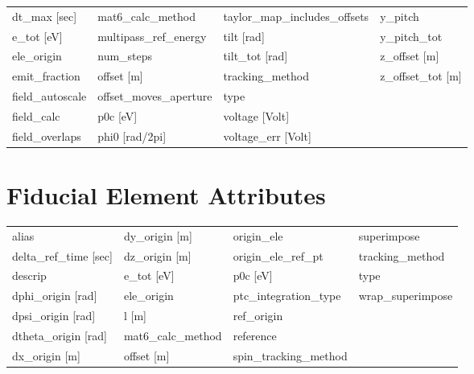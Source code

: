 \begin{tabular}{llll}
dt_max [sec]                     & mat6_calc_method                 & taylor_map_includes_offsets      & y_pitch                          \\
e_tot [eV]                       & multipass_ref_energy             & tilt [rad]                       & y_pitch_tot                      \\
ele_origin                       & num_steps                        & tilt_tot [rad]                   & z_offset [m]                     \\
emit_fraction                    & offset [m]                       & tracking_method                  & z_offset_tot [m]                 \\
field_autoscale                  & offset_moves_aperture            & type                             &                                  \\
field_calc                       & p0c [eV]                         & voltage [Volt]                   &                                  \\
field_overlaps                   & phi0 [rad/2pi]                   & voltage_err [Volt]               &                                  \\
 \bottomrule
 \end{tabular}
 \vfill
 
 \section{Fiducial Element Attributes}
 \label{s:list.fiducial}
 
 \begin{tabular}{llll} \toprule
alias                            & dy_origin [m]                    & origin_ele                       & superimpose                      \\
delta_ref_time [sec]             & dz_origin [m]                    & origin_ele_ref_pt                & tracking_method                  \\
descrip                          & e_tot [eV]                       & p0c [eV]                         & type                             \\
dphi_origin [rad]                & ele_origin                       & ptc_integration_type             & wrap_superimpose                 \\
dpsi_origin [rad]                & l [m]                            & ref_origin                       &                                  \\
dtheta_origin [rad]              & mat6_calc_method                 & reference                        &                                  \\
dx_origin [m]                    & offset [m]                       & spin_tracking_method             &                                  \\
 \bottomrule
 \end{tabular}
 \vfill
 
